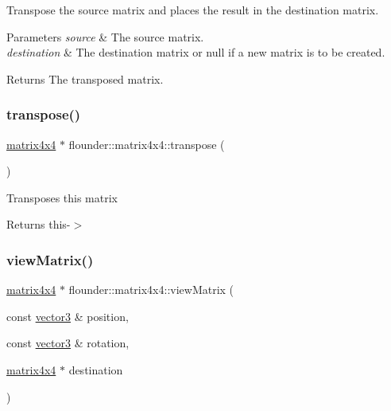 Transpose the source matrix and places the result in the destination matrix. 


\begin{DoxyParams}{Parameters}
{\em source} & The source matrix. \\
\hline
{\em destination} & The destination matrix or null if a new matrix is to be created. \\
\hline
\end{DoxyParams}
\begin{DoxyReturn}{Returns}
The transposed matrix. 
\end{DoxyReturn}
\mbox{\label{classflounder_1_1matrix4x4_aaf0d086f1d886d8aedd61c070f098344}} 
\subsubsection{\texorpdfstring{transpose()}{transpose()}\hspace{0.1cm}{\footnotesize\ttfamily [2/2]}}
{\footnotesize\ttfamily \hyperlink{classflounder_1_1matrix4x4}{matrix4x4} $\ast$ flounder\+::matrix4x4\+::transpose (\begin{DoxyParamCaption}{ }\end{DoxyParamCaption})}



Transposes this matrix 

\begin{DoxyReturn}{Returns}
this-\/$>$ 
\end{DoxyReturn}
\mbox{\label{classflounder_1_1matrix4x4_aee10976c10baabe8c69374ab64431cd4}} 
\subsubsection{\texorpdfstring{view\+Matrix()}{viewMatrix()}}
{\footnotesize\ttfamily \hyperlink{classflounder_1_1matrix4x4}{matrix4x4} $\ast$ flounder\+::matrix4x4\+::view\+Matrix (\begin{DoxyParamCaption}\item[{const \hyperlink{classflounder_1_1vector3}{vector3} \&}]{position,  }\item[{const \hyperlink{classflounder_1_1vector3}{vector3} \&}]{rotation,  }\item[{\hyperlink{classflounder_1_1matrix4x4}{matrix4x4} $\ast$}]{destination }\end{DoxyParamCaption})\hspace{0.3cm}{\ttfamily [static]}}



